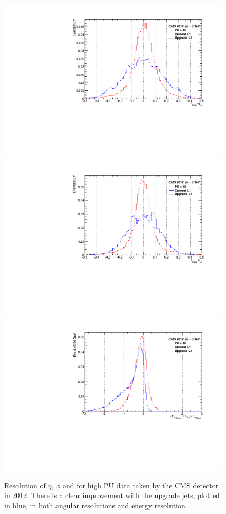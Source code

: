 \begin{figure}[t!]
\begin{center}
  \includegraphics[scale=0.32]{Figures/l1jets//etaRes.pdf}
    \includegraphics[scale=0.32]{Figures/l1jets//phiRes.pdf}
       \includegraphics[scale=0.32]{Figures/l1jets//ptRes.pdf} 
\caption{Resolution of $\eta$, $\phi$ and \pt for high \ac{PU} data taken by the \ac{CMS} detector in 2012. There is a clear improvement with the upgrade jets, plotted in blue, in both angular resolutions and energy resolution.}
\label{JetRes}
\end{center}
\end{figure}

